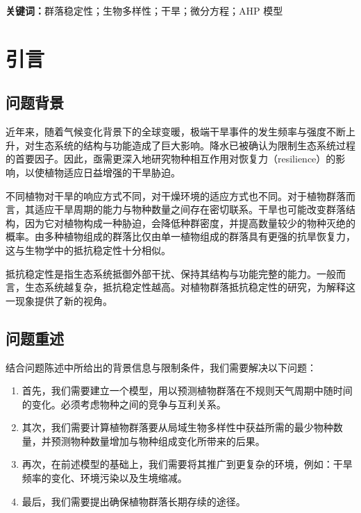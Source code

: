 \documentclass[11pt,a4paper]{ctexart}
\begin{document}
\vspace{6pt}
\noindent\textbf{关键词：}群落稳定性；生物多样性；干旱；微分方程；AHP 模型

\newpage
\pagestyle{fancy}

\section{引言}

\subsection{问题背景}

近年来，随着气候变化背景下的全球变暖，极端干旱事件的发生频率与强度不断上升，对生态系统的结构与功能造成了巨大影响。降水已被确认为限制生态系统过程的首要因子\cite{ref1}。因此，亟需更深入地研究物种相互作用对恢复力（resilience）的影响，以使植物适应日益增强的干旱胁迫\cite{ref2}。

不同植物对干旱的响应方式不同，对干燥环境的适应方式也不同。对于植物群落而言，其适应干旱周期的能力与物种数量之间存在密切联系。干旱也可能改变群落结构，因为它对植物构成一种胁迫，会降低种群密度，并提高数量较少的物种灭绝的概率\cite{ref3}。由多种植物组成的群落比仅由单一植物组成的群落具有更强的抗旱恢复力，这与生物学中的抵抗稳定性十分相似。

抵抗稳定性是指生态系统抵御外部干扰、保持其结构与功能完整的能力。一般而言，生态系统越复杂，抵抗稳定性越高。对植物群落抵抗稳定性的研究，为解释这一现象提供了新的视角。

\subsection{问题重述}

结合问题陈述中所给出的背景信息与限制条件，我们需要解决以下问题：

\begin{enumerate}
\item 首先，我们需要建立一个模型，用以预测植物群落在不规则天气周期中随时间的变化。必须考虑物种之间的竞争与互利关系。
\item 其次，我们需要计算植物群落要从局域生物多样性中获益所需的最少物种数量，并预测物种数量增加与物种组成变化所带来的后果。
\item 再次，在前述模型的基础上，我们需要将其推广到更复杂的环境，例如：干旱频率的变化、环境污染以及生境缩减。
\item 最后，我们需要提出确保植物群落长期存续的途径。
\end{enumerate}
\end{document}
